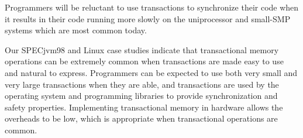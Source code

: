 \documentclass[12pt]{article}
\newcommand{\note}[1]{}%
\begin{document}
Programmers will be reluctant to use transactions to synchronize their
code when it results in their code running more slowly on the uniprocessor
and small-SMP systems which are most common today.
\note{Segue into hardware transactions writeup?}

Our SPECjvm98 and Linux case studies indicate that
transactional memory operations can be extremely common when
transactions are made easy to use and natural to express.  Programmers
can be expected to use both very small and very large transactions
when they are able, and transactions are used by the operating system
and programming libraries to provide synchronization and safety
properties.  Implementing transactional memory in hardware allows the
overheads to be low\note{\textbf{cite figures here}}, which is appropriate
when transactional operations are common.
\end{document}
